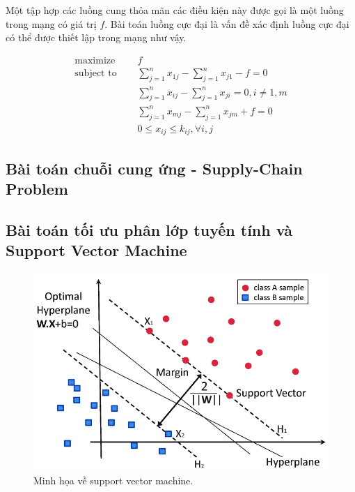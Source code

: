 Một tập hợp các luồng cung thỏa mãn các điều kiện này được gọi là một luồng trong mạng có giá trị $f$. Bài toán luồng cực đại là vấn đề xác định luồng cực đại có thể được thiết lập trong mạng như vậy.

\begin{equation}
    \label{eq:transport_problem}
    \begin{aligned}
        \text{maximize } \quad & f\\
        \text{subject to }\quad & \sum_{j=1}^nx_{1j} - \sum_{j=1}^nx_{j1} - f = 0\\ 
        & \sum_{j=1}^nx_{ij} - \sum_{j=1}^nx_{ji} = 0, i \ne 1, m \\
        & \sum_{j=1}^nx_{mj} - \sum_{j=1}^nx_{jm} + f = 0 \\
            & 0 \leq x_{ij} \leq k_{ij}, \forall i, j
    \end{aligned}   
\end{equation}

\subsection{Bài toán chuỗi cung ứng - Supply-Chain Problem}

\subsection{Bài toán tối ưu phân lớp tuyến tính và Support Vector Machine}

\begin{figure}[h!]
    \includegraphics[width=0.85\linewidth]{figures/svm.png}
    \caption{Minh họa về support vector machine.}
    \label{fig:flow_network}
\end{figure}